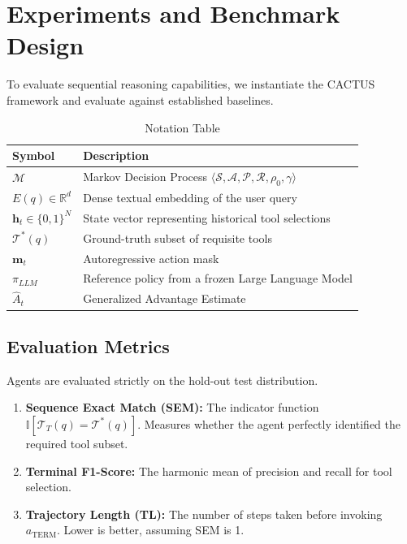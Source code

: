 \documentclass{article}
\begin{document}
\section{Experiments and Benchmark Design}

To evaluate sequential reasoning capabilities, we instantiate the CACTUS framework and evaluate against established baselines.

\begin{table}[h]
\centering
\caption{Notation Table}
\label{tab:notation}
\begin{tabular}{ll}
\toprule
\textbf{Symbol} & \textbf{Description} \\
\midrule
$\mathcal{M}$ & Markov Decision Process $\langle \mathcal{S}, \mathcal{A}, \mathcal{P}, \mathcal{R}, \rho_0, \gamma \rangle$ \\
$E(q) \in \mathbb{R}^d$ & Dense textual embedding of the user query \\
$\mathbf{h}_t \in \{0,1\}^{N}$ & State vector representing historical tool selections \\
$\mathcal{T}^*(q)$ & Ground-truth subset of requisite tools \\
$\mathbf{m}_t$ & Autoregressive action mask \\
$\pi_{LLM}$ & Reference policy from a frozen Large Language Model \\
$\hat{A}_t$ & Generalized Advantage Estimate \\
\bottomrule
\end{tabular}
\end{table}

\subsection{Evaluation Metrics}
Agents are evaluated strictly on the hold-out test distribution.
\begin{enumerate}
    \item \textbf{Sequence Exact Match (SEM):} The indicator function $\mathbb{I}[\mathcal{T}_{T}(q) = \mathcal{T}^*(q)]$. Measures whether the agent perfectly identified the required tool subset.
    \item \textbf{Terminal F1-Score:} The harmonic mean of precision and recall for tool selection.
    \item \textbf{Trajectory Length (TL):} The number of steps taken before invoking $a_{\text{TERM}}$. Lower is better, assuming SEM is 1.
\end{enumerate}
\end{document}
